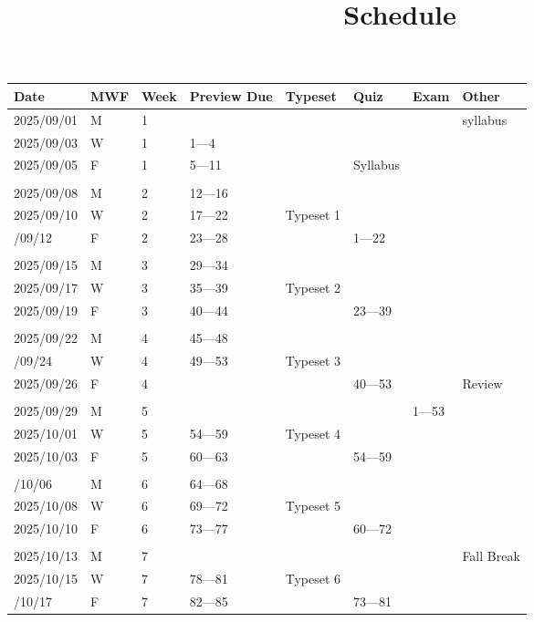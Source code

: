 \documentclass[
]{article}
\title{Schedule}
\author{}
\date{\vspace{-2.5em}}
\begin{document}
\maketitle

\begin{longtable}[t]{llllllll}
\toprule
Date & MWF & Week & Preview Due & Typeset & Quiz & Exam & Other\\
\midrule
2025/09/01 & M & 1 &  &  &  &  & syllabus\\
2025/09/03 & W & 1 & 1—4 &  &  &  & \\
2025/09/05 & F & 1 & 5—11 &  & Syllabus &  & \\
\Xhline{1.2pt}\\
2025/09/08 & M & 2 & 12—16 &  &  &  & \\
2025/09/10 & W & 2 & 17—22 & Typeset 1 &  &  & \\
\addlinespace
2025/09/12 & F & 2 & 23—28 &  & 1—22 &  & \\
\Xhline{1.2pt}\\
2025/09/15 & M & 3 & 29—34 &  &  &  & \\
2025/09/17 & W & 3 & 35—39 & Typeset 2 &  &  & \\
2025/09/19 & F & 3 & 40—44 &  & 23—39 &  & \\
\Xhline{1.2pt}\\
2025/09/22 & M & 4 & 45—48 &  &  &  & \\
\addlinespace
2025/09/24 & W & 4 & 49—53 & Typeset 3 &  &  & \\
2025/09/26 & F & 4 &  &  & 40—53 &  & Review\\
\Xhline{1.2pt}\\
2025/09/29 & M & 5 &  &  &  & 1—53 & \\
2025/10/01 & W & 5 & 54—59 & Typeset 4 &  &  & \\
2025/10/03 & F & 5 & 60—63 &  & 54—59 &  & \\
\Xhline{1.2pt}\\
\addlinespace
2025/10/06 & M & 6 & 64—68 &  &  &  & \\
2025/10/08 & W & 6 & 69—72 & Typeset 5 &  &  & \\
2025/10/10 & F & 6 & 73—77 &  & 60—72 &  & \\
\Xhline{1.2pt}\\
2025/10/13 & M & 7 &  &  &  &  & Fall Break\\
2025/10/15 & W & 7 & 78—81 & Typeset 6 &  &  & \\
\addlinespace
2025/10/17 & F & 7 & 82—85 &  & 73—81 &  & \\

\end{longtable}
\end{document}
